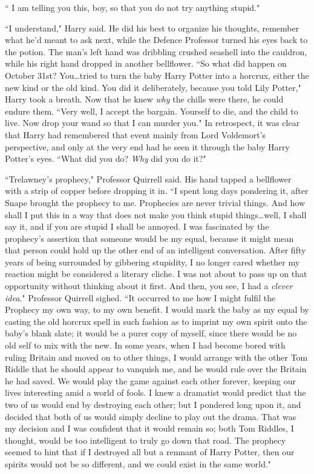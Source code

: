 `` I am telling you this, boy, so that you do not try anything stupid."

``I understand," Harry said. He did his best to organize his thoughts, remember what he'd meant to ask next, while the Defence Professor turned his eyes back to the potion. The man's left hand was dribbling crushed seashell into the cauldron, while his right hand dropped in another bellflower. ``So what did happen on October 31st? You…tried to turn the baby Harry Potter into a horcrux, either the new kind or the old kind. You did it deliberately, because you told Lily Potter," Harry took a breath. Now that he knew \emph{why} the chills were there, he could endure them. ``Very well, I accept the bargain. Yourself to die, and the child to live. Now drop your wand so that I can murder you." In retrospect, it was clear that Harry had remembered that event mainly from Lord Voldemort's perspective, and only at the very end had he seen it through the baby Harry Potter's eyes. ``What did you do? \emph{Why} did you do it?"

``Trelawney's prophecy," Professor Quirrell said. His hand tapped a bellflower with a strip of copper before dropping it in. ``I spent long days pondering it, after Snape brought the prophecy to me. Prophecies are never trivial things. And how shall I put this in a way that does not make you think stupid things…well, I shall say it, and if you are stupid I shall be annoyed. I was fascinated by the prophecy's assertion that someone would be my equal, because it might mean that person could hold up the other end of an intelligent conversation. After fifty years of being surrounded by gibbering stupidity, I no longer cared whether my reaction might be considered a literary cliche. I was not about to pass up on that opportunity without thinking about it first. And then, you see, I had a \emph{clever idea}." Professor Quirrell sighed. ``It occurred to me how I might fulfil the Prophecy my own way, to my own benefit. I would mark the baby as my equal by casting the old horcrux spell in such fashion as to imprint my own spirit onto the baby's blank slate; it would be a purer copy of myself, since there would be no old self to mix with the new. In some years, when I had become bored with ruling Britain and moved on to other things, I would arrange with the other Tom Riddle that he should appear to vanquish me, and he would rule over the Britain he had saved. We would play the game against each other forever, keeping our lives interesting amid a world of fools. I knew a dramatist would predict that the two of us would end by destroying each other; but I pondered long upon it, and decided that both of us would simply decline to play out the drama. That was my decision and I was confident that it would remain so; both Tom Riddles, I thought, would be too intelligent to truly go down that road. The prophecy seemed to hint that if I destroyed all but a remnant of Harry Potter, then our spirits would not be so different, and we could exist in the same world."


